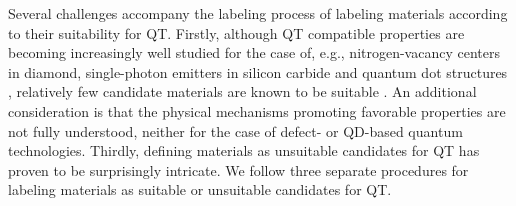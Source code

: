 \documentclass[superscriptaddress,unsortedaddress,
 amsmath,amssymb,
 aps,
]{revtex4-2}
\begin{document}
Several challenges accompany the labeling process of labeling materials according to their suitability for QT. 
Firstly, although QT compatible properties are becoming increasingly well studied for the case of, e.g., nitrogen-vacancy centers in diamond, single-photon emitters in silicon carbide and quantum dot structures \cite{Doherty_2013,Bathen2021,Aharonovich_2016}, relatively few candidate materials are known to be suitable \cite{Atatuere2018,Zhang2020}. An additional consideration is that the physical mechanisms promoting favorable properties are not fully understood, neither for the case of defect- or QD-based quantum technologies. 
Thirdly, defining materials as unsuitable candidates for QT has proven to be surprisingly intricate. 
We follow three separate procedures for labeling materials as suitable or unsuitable candidates for QT. 
\end{document}
